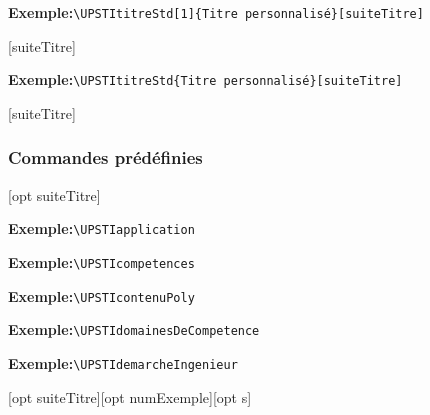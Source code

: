 \documentclass[11pt]{ltxdockit}[2010/09/26]
\newcommand{\ex}{\noindent \textbf{Exemple:}\quad}
\begin{document}
\ex\verb!\UPSTItitreStd[1]{Titre personnalisé}[suiteTitre]!

[suiteTitre]

\ex\verb!\UPSTItitreStd{Titre personnalisé}[suiteTitre]!

[suiteTitre]

\subsubsection{Commandes prédéfinies}
\begin{ltxsyntax}
[opt suiteTitre]
\end{ltxsyntax}
\ex\verb!\UPSTIapplication!

\vspace{1em}
\UPSTIapplication

\vspace{1em}
\begin{ltxsyntax}
\end{ltxsyntax}
\ex\verb!\UPSTIcompetences!

\vspace{1em}
\UPSTIcompetences

\vspace{1em}
\begin{ltxsyntax}
\end{ltxsyntax}
\ex\verb!\UPSTIcontenuPoly!

\vspace{1em}
\UPSTIcontenuPoly

\vspace{1em}
\begin{ltxsyntax}
\end{ltxsyntax}
\ex\verb!\UPSTIdomainesDeCompetence!

\vspace{1em}
\UPSTIdomainesDeCompetence

\vspace{1em}
\begin{ltxsyntax}
\end{ltxsyntax}
\ex\verb!\UPSTIdemarcheIngenieur!

\vspace{1em}
\UPSTIdemarcheIngenieur

\vspace{1em}
\begin{ltxsyntax}
[opt suiteTitre][opt numExemple][opt s]
\end{ltxsyntax}
\end{document}
